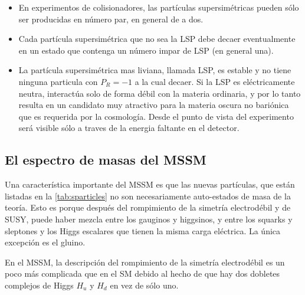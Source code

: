 \begin{itemize}
\item En experimentos de colisionadores, las partículas supersimétricas pueden
  sólo ser producidas en número par, en general de a dos.
\item Cada partícula supersimétrica que no sea la LSP debe decaer eventualmente
  en un estado que contenga un número impar de LSP (en general una).
\item La partícula supersimétrica mas liviana, llamada LSP, es estable y no tiene
  ninguna particula con $P_R = -1$ a la cual decaer. Si
  la LSP es eléctricamente neutra, interactúa solo de forma débil con la materia
  ordinaria, y por lo tanto resulta en un candidato muy atractivo para la
  materia oscura no bariónica que es requerida por la cosmología. Desde el punto de
  vista del experimento será visible sólo a traves de la energia faltante en el detector.
\end{itemize}



\subsection{El espectro de masas del MSSM}

Una característica importante del MSSM es que las nuevas partículas, que están
listadas en la \cref{tab:sparticles} no son necesariamente auto-estados de masa
de la teoría. Esto es porque después del rompimiento de la simetría
electrodébil y de SUSY, puede haber mezcla entre los gauginos y higgsinos, y
entre los squarks y sleptones y los Higgs escalares que tienen la misma carga
eléctrica. La única excepción es el gluino.

En el MSSM, la descripción del rompimiento de la simetría electrodébil es un
poco más complicada que en el SM debido al hecho de que hay dos dobletes
complejos de Higgs $H_u$ y $H_d$ en vez de sólo uno.




